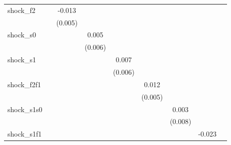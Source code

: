 {\begin{tabular}{l*{8}{c}}
\addlinespace
shock\_f2    &                     &      -0.013\sym{**} &                     &                     &                     &                     &                     &                     \\
            &                     &     (0.005)         &                     &                     &                     &                     &                     &                     \\
\addlinespace
shock\_s0    &                     &                     &       0.005         &                     &                     &                     &                     &                     \\
            &                     &                     &     (0.006)         &                     &                     &                     &                     &                     \\
\addlinespace
shock\_s1    &                     &                     &                     &       0.007         &                     &                     &                     &                     \\
            &                     &                     &                     &     (0.006)         &                     &                     &                     &                     \\
\addlinespace
shock\_f2f1  &                     &                     &                     &                     &       0.012\sym{**} &                     &                     &                     \\
            &                     &                     &                     &                     &     (0.005)         &                     &                     &                     \\
\addlinespace
shock\_s1s0  &                     &                     &                     &                     &                     &       0.003         &                     &                     \\
            &                     &                     &                     &                     &                     &     (0.008)         &                     &                     \\
\addlinespace
shock\_s1f1  &                     &                     &                     &                     &                     &                     &      -0.023\sym{*}  &                     \\

\end{tabular}}
